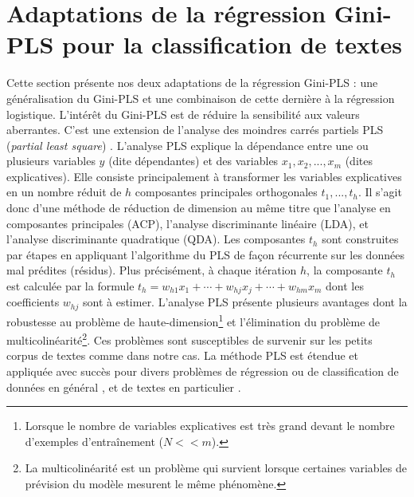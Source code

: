\section{Adaptations de la régression Gini-PLS pour la classification de textes}
\label{sec:sensresultat:pls}
Cette section présente nos deux adaptations de la régression Gini-PLS \citep{mussard2018ginipls} : une généralisation du Gini-PLS et une combinaison de cette dernière à la régression logistique. L'intérêt du Gini-PLS est de réduire la sensibilité aux valeurs aberrantes. C'est une extension de l'analyse des moindres carrés partiels PLS (\textit{partial least square}) \citep{wold1966pls}. L'analyse PLS explique la dépendance entre une ou plusieurs variables $y$ (dite dépendantes) et des variables $x_1,x_2,...,x_m$ (dites explicatives). Elle consiste principalement à transformer les variables explicatives en un nombre réduit de $h$ composantes principales orthogonales $t_1, ..., t_h$. Il s'agit donc d'une méthode de réduction de dimension au même titre que l'analyse en composantes principales (ACP), l'analyse discriminante linéaire (LDA), et l'analyse discriminante quadratique (QDA). Les composantes $t_h$ sont construites par étapes en appliquant l'algorithme du PLS de façon récurrente sur les données mal prédites (résidus). Plus précisément, à chaque itération $h$, la composante $t_h$ est calculée par la formule $t_h = w_{h1} x_1 + \cdots + w_{hj} x_j + \cdots + w_{hm} x_m$ dont les coefficients $w_{hj}$ sont à estimer. L'analyse PLS présente plusieurs avantages \citep{lacroux2011avantagesPLS} dont la robustesse au problème de haute-dimension\footnote{Lorsque le nombre de variables explicatives est très grand devant le nombre d'exemples d'entraînement ($N << m$).} et l'élimination du problème de multicolinéarité\footnote{La multicolinéarité est un problème qui survient lorsque certaines variables de prévision du modèle mesurent le même phénomène.}\citep{kroll2013impactOfMulticollinearity-PLS}. Ces problèmes sont susceptibles de survenir sur les petits corpus de textes comme dans notre cas.  La méthode PLS est étendue et appliquée avec succès pour divers problèmes de régression \citep{lacroux2011avantagesPLS}
 ou de classification de données en général \citep{liu2007pls4classif,durif2017sparsePLSandLogit, bazzoli2018classificationwithLS-PLS}, et de textes en particulier \citep{zeng2007textclassPLS}.



